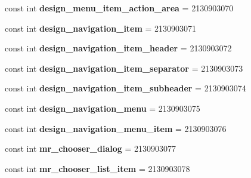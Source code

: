 \begin{DoxyCompactItemize}
const int {\bfseries design\+\_\+menu\+\_\+item\+\_\+action\+\_\+area} = 2130903070
\item 
\mbox{\label{class_sample_app_1_1_droid_1_1_resource_1_1_layout_a55bc438f708b7e49003a689577ebedd3}} 
const int {\bfseries design\+\_\+navigation\+\_\+item} = 2130903071
\item 
\mbox{\label{class_sample_app_1_1_droid_1_1_resource_1_1_layout_ad3bfe1b59f17c8e84e918e3e84b926bf}} 
const int {\bfseries design\+\_\+navigation\+\_\+item\+\_\+header} = 2130903072
\item 
\mbox{\label{class_sample_app_1_1_droid_1_1_resource_1_1_layout_a6354cfd2d7fdba7d47cd44f8a4c3ac41}} 
const int {\bfseries design\+\_\+navigation\+\_\+item\+\_\+separator} = 2130903073
\item 
\mbox{\label{class_sample_app_1_1_droid_1_1_resource_1_1_layout_ab96c4cb45df1effd4de440f30aedb335}} 
const int {\bfseries design\+\_\+navigation\+\_\+item\+\_\+subheader} = 2130903074
\item 
\mbox{\label{class_sample_app_1_1_droid_1_1_resource_1_1_layout_a79a017eafd25d78f3396b62cae1a1d4a}} 
const int {\bfseries design\+\_\+navigation\+\_\+menu} = 2130903075
\item 
\mbox{\label{class_sample_app_1_1_droid_1_1_resource_1_1_layout_a124635b35df89af1ea4311199efff944}} 
const int {\bfseries design\+\_\+navigation\+\_\+menu\+\_\+item} = 2130903076
\item 
\mbox{\label{class_sample_app_1_1_droid_1_1_resource_1_1_layout_ace8e0d624b52235af514f2b539e14a80}} 
const int {\bfseries mr\+\_\+chooser\+\_\+dialog} = 2130903077
\item 
\mbox{\label{class_sample_app_1_1_droid_1_1_resource_1_1_layout_abe5b4e1924b7858d40684c30b960ade4}} 
const int {\bfseries mr\+\_\+chooser\+\_\+list\+\_\+item} = 2130903078

\end{DoxyCompactItemize}
